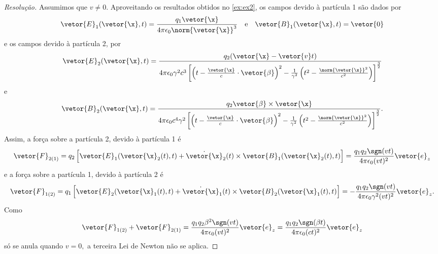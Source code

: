 \begin{proof}[Resolução]
   Assumimos que \(v \neq 0\). Aproveitando os resultados obtidos no \cref{ex:ex2}, os campos devido à partícula 1 são dados por
   \begin{equation*}
      \vetor{E}_1(\vetor{\x}, t) = \frac{q_1 \vetor{\x}}{4\pi \epsilon_0 \norm{\vetor{\x}}^3} 
      \quad\text{e}\quad
      \vetor{B}_1(\vetor{\x}, t) = \vetor{0}
   \end{equation*}
   e os campos devido à partícula 2, por
   \begin{equation*}
      \vetor{E}_2(\vetor{\x},t) = \frac{q_2 (\vetor{\x} - \vetor{v}t)}{4\pi \epsilon_0\gamma^2c^3 \left[\left(t - \frac{\vetor{\x}}{c} \cdot \vetor{\beta}\right)^2 - \frac1{\gamma^2} \left(t^2 - \frac{\norm{\vetor{\x}}^2}{c^2}\right)\right]^{\frac32}}
   \end{equation*}
   e
   \begin{equation*}
      \vetor{B}_2(\vetor{\x}, t) = \frac{q_2 \vetor{\beta} \times \vetor{\x}}{4\pi \epsilon_0 c^4 \gamma^2 \left[\left(t - \frac{\vetor{\x}}{c} \cdot \vetor{\beta}\right)^2 - \frac{1}{\gamma^2} \left(t^2 - \frac{\norm{\vetor{\x}}^2}{c^2}\right)\right]^{\frac32}}.
   \end{equation*}
   Assim, a força sobre a partícula 2, devido à partícula 1 é
   \begin{equation*}
      \vetor{F}_{2(1)} = q_2 \left[\vetor{E}_1(\vetor{\x}_2(t), t) + \dot{\vetor{\x}}_2(t) \times \vetor{B}_1(\vetor{\x}_2(t), t)\right] = \frac{q_1 q_2 \sgn(v t)}{4\pi \epsilon_0 (vt)^2}\vetor{e}_z
   \end{equation*}
   e a força sobre a partícula 1, devido à partícula 2 é
   \begin{equation*}
      \vetor{F}_{1(2)} = q_1 \left[\vetor{E}_2(\vetor{\x}_1(t), t) + \dot{\vetor{\x}}_1(t) \times \vetor{B}_2(\vetor{\x}_1(t), t)\right] = -\frac{q_1 q_2\sgn(vt)}{4\pi \epsilon_0 \gamma^2 (v t)^2} \vetor{e}_z.
   \end{equation*}
   Como
   \begin{equation*}
      \vetor{F}_{1(2)} + \vetor{F}_{2(1)} = \frac{q_1 q_2 \beta^2\sgn(vt)}{4 \pi \epsilon_0 (vt)^2}\vetor{e}_z = \frac{q_1 q_2 \sgn(\beta t)}{4\pi \epsilon_0 (ct)^2} \vetor{e}_z
   \end{equation*}
   só se anula quando \(v = 0,\) a terceira Lei de Newton não se aplica.


\end{proof}
